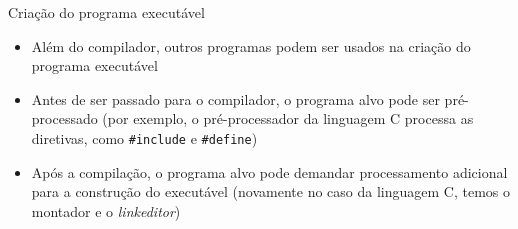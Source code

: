 \begin{frame}[fragile]{Criação do programa executável}

    \begin{itemize}
        \item Além do compilador, outros programas podem ser usados na criação do programa executável
        \pause

        \item Antes de ser passado para o compilador, o programa alvo pode ser pré-processado (por exemplo, o pré-processador da linguagem C processa as
            diretivas, como \texttt{#include} e \texttt{#define})
        \pause

        \item Após a compilação, o programa alvo pode demandar processamento adicional para a construção do executável (novamente no caso da linguagem C, temos
            o montador e o \textit{linkeditor})

    \end{itemize}

\end{frame}

